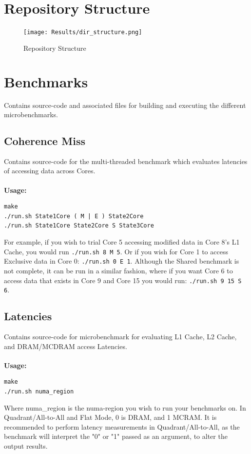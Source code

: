 \documentclass[bsc,frontabs,twoside,singlespacing,parskip,deptreport]{infthesis}     %
\begin{document}
\section{Repository Structure}

\begin{figure}[!h]
    \centering
    \texttt{[image: Results/dir\_structure.png]}
    \caption{Repository Structure}
    \label{fig:repo-struct}
\end{figure}


\section{Benchmarks}
Contains source-code and associated files for building and executing the different microbenchmarks.

\subsection{Coherence Miss}
Contains source-code for the multi-threaded benchmark which evaluates latencies of accessing data across Cores. \\
\\
\textbf{Usage:}
\begin{verbatim}
make
./run.sh State1Core ( M | E ) State2Core
./run.sh State1Core State2Core S State3Core
\end{verbatim}

For example, if you wish to trial Core 5 accessing modified data in Core 8's L1 Cache, you would run \texttt{./run.sh 8 M 5}. Or if you wish for Core 1 to access Exclusive data in Core 0: \texttt{./run.sh 0 E 1}. Although the Shared benchmark is not complete, it can be run in a similar fashion, where if you want Core 6 to access data that exists in Core 9 and Core 15 you would run: \texttt{./run.sh 9 15 S 6}.

\subsection{Latencies}
Contains source-code for microbenchmark for evaluating L1 Cache, L2 Cache, and DRAM/MCDRAM access Latencies. \\
\\
\textbf{Usage:}
\begin{verbatim}
make
./run.sh numa_region
\end{verbatim}

Where numa\_region is the numa-region you wish to run your benchmarks on. In Quadrant/All-to-All and Flat Mode, 0 is DRAM, and 1 MCRAM. It is recommended to perform latency measurements in Quadrant/All-to-All, as the benchmark will interpret the "0" or "1" passed as an argument, to alter the output results.
\end{document}
